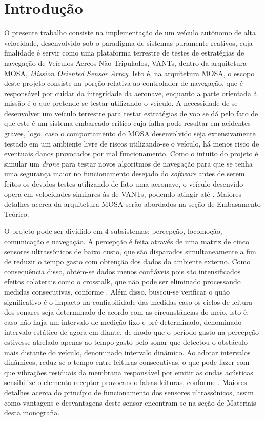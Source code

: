  \chapter{Introdução}
O presente trabalho consiste na implementação de um veículo autônomo de alta
velocidade, desenvolvido sob o paradigma de sistemas puramente reativos, cuja finalidade
é servir como uma plataforma terrestre de testes de estratégias de navegação de Veículos
Aereos Não Tripulados, VANTs, dentro da arquitetura MOSA, \textit{Mission Oriented Sensor
Array}. Isto é, na arquitetura MOSA, o escopo deste projeto consiste na porção relativa
ao controlador de navegação, que é responsável por cuidar da integridade da aeronave, enquanto a parte
orientada à missão é o que pretende-se testar utilizando o veículo. A necessidade de
se desenvolver um veículo terrestre para testar estratégias de voo se dá pelo fato de que este é
um sistema embarcado crítico cuja falha pode resultar em acidentes graves, logo, caso o
comportamento do MOSA desenvolvido seja extensivamente testado em um ambiente livre
de riscos utilizando-se o veículo, há menos risco de eventuais danos provocados por mal
funcionamento. 
Como o intuito do projeto é simular um \textit{drone} para testar novos algoritmos de navegação para que 
se tenha uma segurança maior no funcionamento desejado do \textit{software} antes de serem feitos os devidos 
testes utilizando de fato uma aeronave, o veículo desenvido opera em velocidades similares às de VANTs,
podendo atingir até .
Maiores detalhes acerca da arquitetura MOSA serão abordados na seção
de Embasamento Teórico.

O projeto pode ser dividido em 4 subsistemas: percepção, locomoção, comunicação
e navegação. A percepção é feita através de uma matriz de cinco sensores ultrassônicos
de baixo custo, que são disparados simultaneamente a fim de reduzir o tempo gasto
com obtenção dos dados do ambiente externo. Como consequência disso, obtém-se dados
menos confiáveis pois são intensificados efeitos colaterais como o crosstalk, que não pode ser
eliminado processando medidas consecutivas, conforme . Além disso, buscou-se verificar
o quão significativo é o impacto na confiabilidade das medidas caso os ciclos de leitura dos
sonares seja determinado de acordo com as circunstâncias do meio, isto é, caso não haja
um intervalo de medição fixo e pré-determinado, denominado intervalo estático de agora
em diante, de modo que o período gasto na percepção estivesse atrelado apenas ao tempo
gasto pelo sonar que detectou o obstáculo mais distante do veículo, denominado intervalo
dinâmico. Ao adotar intervalos dinâmicos, reduz-se o tempo entre leituras consecutivas,
o que pode fazer com que vibrações residuais da membrana responsável por emitir as
ondas acústicas sensibilize o elemento receptor provocando falsas leituras, conforme .
Maiores detalhes acerca do princípio de funcionamento dos sensores ultrassônicos, assim
como vantagens e desvantagens deste sensor encontram-se na seção de Materiais desta
monografia.

